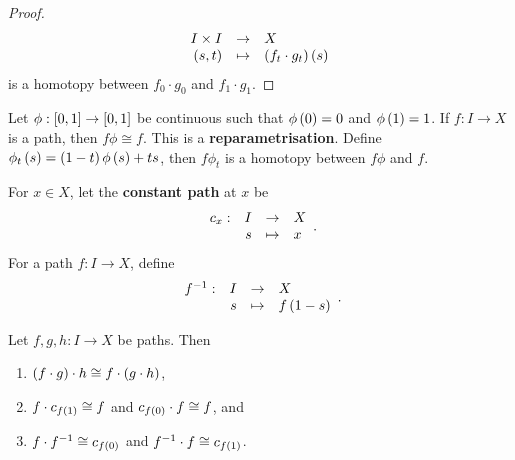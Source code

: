 \begin{proof}
$$ \function{I \times I}{X}{\rb{s, t}}{\rb{f_t \cdot g_t}\rb{s}} $$
is a homotopy between $ f_0 \cdot g_0 $ and $ f_1 \cdot g_1 $.
\end{proof}

\begin{remark*}
Let $ \phi : \sb{0, 1} \to \sb{0, 1} $ be continuous such that $ \phi\rb{0} = 0 $ and $ \phi\rb{1} = 1 $. If $ f : I \to X $ is a path, then $ f\phi \cong f $. This is a \textbf{reparametrisation}. Define $ \phi_t\rb{s} = \rb{1 - t}\phi\rb{s} + ts $, then $ f\phi_t $ is a homotopy between $ f\phi $ and $ f $.
\end{remark*}

For $ x \in X $, let the \textbf{constant path} at $ x $ be
$$ \function[c_x]{I}{X}{s}{x}. $$
For a path $ f : I \to X $, define
$$ \function[f^{-1}]{I}{X}{s}{f\rb{1 - s}}. $$

\begin{lemma}
\label{lem:1.3}
Let $ f, g, h : I \to X $ be paths. Then
\begin{enumerate}
\item $ \rb{f \cdot g} \cdot h \cong f \cdot \rb{g \cdot h} $,
\item $ f \cdot c_{f\rb{1}} \cong f $ and $ c_{f\rb{0}} \cdot f \cong f $, and
\item $ f \cdot f^{-1} \cong c_{f\rb{0}} $ and $ f^{-1} \cdot f \cong c_{f\rb{1}} $.
\end{enumerate}
\end{lemma}

